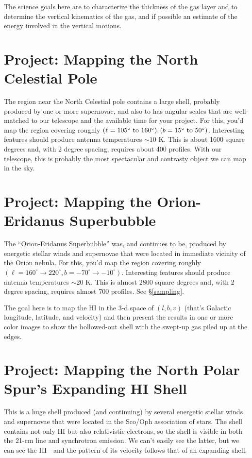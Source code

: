 \documentclass[psfig,preprint]{aastex}
\begin{document}
	The science goals here are to characterize the thickness of the
gas layer and to determine the vertical kinematics of the gas, and if
possible an estimate of the energy involved in the vertical motions.

\section{Project: Mapping the North Celestial Pole} \label{celestial}

\noindent
The region near the North Celestial pole contains a large shell,
probably produced by one or more supernovae, and also to has angular
scales that are well-matched to our telescope and the available time for
your project. For this, you'd map the region covering roughly
$(\ell=105^\circ \ {\rm to} \ 160^\circ), (b=15^\circ \ {\rm to}
\ 50^\circ)$. Interesting features should produce antenna temperatures
$\sim 10$ K. This is about 1600 square degrees and, with 2 degree
spacing, requires about 400 profiles. With our telescope, this is
probably the most spectacular and contrasty object we can map in the
sky.

\section{Project: Mapping the Orion-Eridanus Superbubble} \label{eridanus}

\noindent
The ``Orion-Eridanus Superbubble'' was, and continues to be, produced by
energetic stellar winds and supernovae that were located in immediate
vicinity of the Orion nebula. For this, you'd map the region covering
roughly $(\ell=160^\circ \rightarrow 220^\circ, b=-70^\circ \rightarrow
-10^\circ)$. Interesting features should produce antenna temperatures
$\sim 20$ K. This is almost 2800 square degrees and, with 2 degree
spacing, requires almost 700 profiles. See \S \ref{sampling}.

The goal here is to map the HI in the 3-d space of $(l, b, v)$ (that's
Galactic longitude, latitude, and velocity) and then present the results
in one or more color images to show the hollowed-out shell with the
swept-up gas piled up at the edges.

\section{Project: Mapping the North Polar Spur's Expanding HI Shell}

\noindent
This is a huge shell produced (and continuing) by several energetic
stellar winds and supernovae that were located in the Sco/Oph
association of stars. The shell contains not only HI but also
relativistic electrons, so the shell is visible in both the 21-cm line
and synchrotron emission. We can't easily see the latter, but we can see
the HI---and the pattern of its velocity follows that of an expanding
shell.
\end{document}
